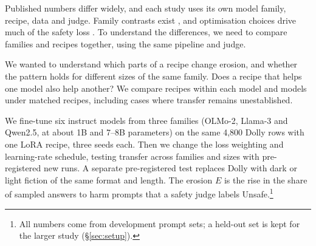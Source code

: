 \documentclass[11pt]{article}
\begin{document}
Published numbers differ widely, and each study uses its own model family,
recipe, data and judge. Family contrasts exist
\citep{hawkins2026heterogeneoussafetyimpactsbenign,khan2026safetydriftfinetuningevidence,guo2026safety},
and optimisation choices drive much of the safety loss
\citep{kim2025rethinking}. To understand the differences, we need to compare
families and recipes together, using the same pipeline and judge.

We wanted to understand which parts of a recipe change erosion, and whether
the pattern holds for different sizes of the same family. Does a recipe that
helps one model also help another? We compare recipes within each model and
models under matched recipes, including cases where transfer remains
unestablished.

We fine-tune six instruct models from three families (OLMo-2, Llama-3 and
Qwen2.5, at about 1B and 7--8B parameters) on the same 4,800 Dolly rows with
one LoRA recipe, three seeds each. Then we change the loss weighting and
learning-rate schedule, testing transfer across families and sizes with
pre-registered new runs. A separate pre-registered test replaces Dolly with
dark or light fiction of the same format and length.
The erosion $E$ is the rise in the share of sampled answers to harm
prompts that a safety judge labels Unsafe.\footnote{All numbers come from
development prompt sets; a held-out set is kept for the larger study
(\S\ref{sec:setup}).}
\end{document}
